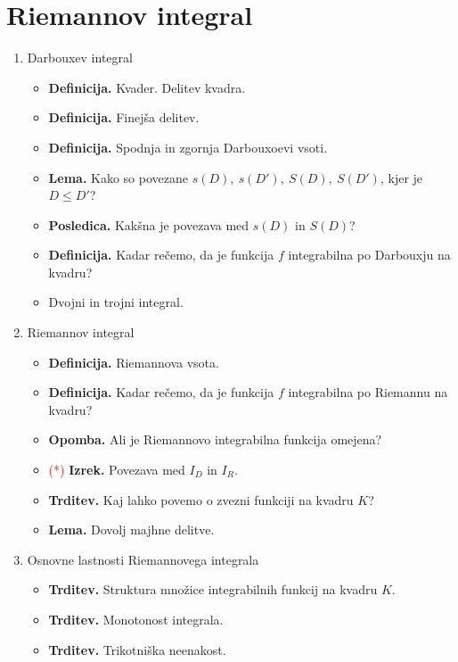 \section{Riemannov integral}
\begin{enumerate}
    \item Darbouxev integral
    \begin{itemize}
        \item \textbf{Definicija.} Kvader. Delitev kvadra.
        \item \textbf{Definicija.} Finejša delitev.
        \item \textbf{Definicija.} Spodnja in zgornja Darbouxoevi vsoti.
        \item \textbf{Lema.} Kako so povezane \(s(D), \ s(D'), \ S(D), \ S(D')\), kjer je \(D \leq D'\)?
        \item \textbf{Posledica.} Kakšna je povezava med \(s(D)\) in \(S(D)\)?
        \item \textbf{Definicija.} Kadar rečemo, da je funkcija \(f\) integrabilna po Darbouxju na kvadru?
        \item Dvojni in trojni integral.
    \end{itemize}

    \item Riemannov integral
    \begin{itemize}
        \item \textbf{Definicija.} Riemannova vsota.
        \item \textbf{Definicija.} Kadar rečemo, da je funkcija \(f\) integrabilna po Riemannu na kvadru?
        \item \textbf{Opomba.} Ali je Riemannovo integrabilna funkcija omejena?
        \item \textcolor{red}{(*)} \textbf{Izrek.} Povezava med \(I_D\) in \(I_R\).
        \item \textbf{Trditev.} Kaj lahko povemo o zvezni funkciji na kvadru \(K\)?
        \item \textbf{Lema.} Dovolj majhne delitve. 
    \end{itemize}

    \item Osnovne lastnosti Riemannovega integrala
    \begin{itemize}
        \item \textbf{Trditev.} Struktura množice integrabilnih funkcij na kvadru \(K\).
        \item \textbf{Trditev.} Monotonost integrala.
        \item \textbf{Trditev.} Trikotniška neenakost.
    \end{itemize}


\end{enumerate}
